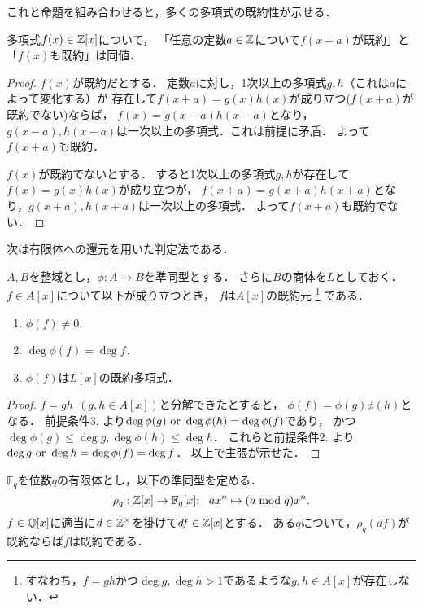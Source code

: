 \documentclass[a4j]{jsarticle}
\begin{document}
これと命題を組み合わせると，多くの多項式の既約性が示せる．
\begin{Prop}
    多項式$f(x) \in \mathbb{Z}[x]$について，
    「任意の定数$a \in \mathbb{Z}$について$f(x+a)$が既約」と「$f(x)$も既約」は同値．
\end{Prop}
\begin{proof}
    $f(x)$が既約だとする．
    定数$a$に対し，1次以上の多項式$g,h$（これは$a$によって変化する）が
    存在して$f(x+a)=g(x)h(x)$が成り立つ($f(x+a)$が既約でない)ならば，
    $f(x)=g(x-a)h(x-a)$となり，$g(x-a), h(x-a)$は一次以上の多項式．これは前提に矛盾．
    よって$f(x+a)$も既約．

    $f(x)$が既約でないとする．
    すると1次以上の多項式$g,h$が存在して$f(x)=g(x)h(x)$が成り立つが，
    $f(x+a)=g(x+a) h(x+a)$となり，$g(x+a), h(x+a)$は一次以上の多項式．
    よって$f(x+a)$も既約でない．
\end{proof}

次は有限体への還元を用いた判定法である．
\begin{Them}
    $A,B$を整域とし，$\phi: A \to B$を準同型とする．
    さらに$B$の商体を$L$としておく．
    $f \in A[x]$について以下が成り立つとき，
    $f$は$A[x]$の既約元
    \footnote{すなわち，$f=gh$かつ$\deg g, \deg h >1$であるような$g,h \in A[x]$が存在しない．}
    である．
    \begin{enumerate}
        \item $\phi(f) \neq 0$.
        \item $\deg \phi(f)=\deg f$．
        \item $\phi(f)$は$L[x]$の既約多項式．
    \end{enumerate}
\end{Them}
\begin{proof}
    $f=gh ~~(g,h \in A[x])$と分解できたとすると，
    $\phi(f)=\phi(g) \phi(h)$となる．
    前提条件3. より$\deg \phi(g) \text{ or } \deg \phi(h)=\deg \phi(f)$であり，
    かつ$\deg \phi(g) \leq \deg g, \deg \phi(h) \leq \deg h$．
    これらと前提条件2. より$\deg g \text{ or } \deg h=\deg \phi(f)=\deg f$．
    以上で主張が示せた．
\end{proof}

\begin{Cor}
    $\mathbb{F}_q$を位数$q$の有限体とし，以下の準同型を定める．
    \[ \rho_q: \mathbb{Z}[x] \to \mathbb{F}_q[x];~~ ax^n \mapsto (a \bmod q)x^n. \]
    $f \in \mathbb{Q}[x]$に適当に$d \in \mathbb{Z}^{\times}$を掛けて$df \in \mathbb{Z}[x]$とする．
    ある$q$について，$\rho_q(df)$が既約ならば$f$は既約である．
\end{Cor}
\end{document}
